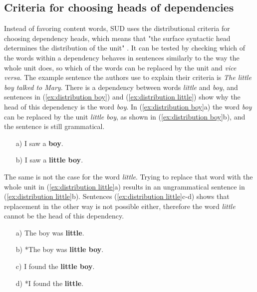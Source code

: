 \subsection{Criteria for choosing heads of dependencies}\label{sec:sud criteria}
Instead of favoring content words, SUD uses the distributional criteria for choosing dependency heads, which means that "the surface syntactic head determines the distribution of the unit" \citep{gerdes-etal-2018-sud}. It can be tested by checking which of the words within a dependency behaves in sentences similarly to the way the whole unit does, so which of the words can be replaced by the unit and \textsl{vice versa}. The example sentence the authors use to explain their criteria is \textsl{The little boy talked to Mary}. There is a dependency between words \textsl{little} and \textsl{boy}, and sentences in (\ref{ex:distribution boy}) and (\ref{ex:distribution little}) show why the head of this dependency is the word \textsl{boy}. In (\ref{ex:distribution boy}a) the word \textsl{boy} can be replaced by the unit \textsl{little boy}, as shown in (\ref{ex:distribution boy}b), and the sentence is still grammatical. 

\begin{exe}
    \ex
    \label{ex:distribution boy}
    \begin{itemize}
        \item[a)] I saw a \textbf{boy}.
        \item[b)] I saw a \textbf{little boy}.
    \end{itemize}
\end{exe}

The same is not the case for the word \textsl{little}. Trying to replace that word with the whole unit in (\ref{ex:distribution little}a) results in an ungrammatical sentence in (\ref{ex:distribution little}b). Sentences (\ref{ex:distribution little}c-d) shows that replacement in the other way is not possible either, therefore the word \textsl{little} cannot be the head of this dependency.

\begin{exe}
    \ex
    \label{ex:distribution little}
    \begin{itemize}
        \item[a)] The boy was \textbf{little}.
        \item[b)] *The boy was \textbf{little boy}.
        \item[c)] I found the \textbf{little boy}.
        \item[d)] *I found the \textbf{little}.
    \end{itemize}
\end{exe}

